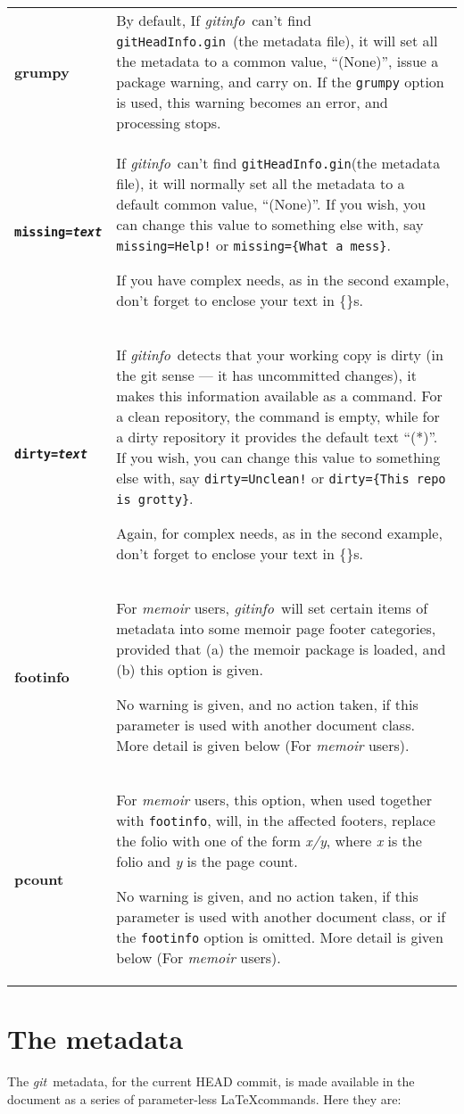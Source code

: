 \documentclass[a4paper,12pt,twoside,openany]{memoir}
\newcommand{\sfit}[1]{\textit{#1}}
\newcommand{\git}{\sfit{git}}
\newcommand{\tpname}{\sfit{gitinfo}}
\newcommand{\ginname}{gitHeadInfo.gin}
\newcommand{\metaname}{\texttt{\ginname}}
\begin{document}
\noindent
\begin{tabularx}{\textwidth}{@{}>{\ttfamily\bfseries}lX@{}}
grumpy&
By default, If \tpname\ can't find \metaname\ (the metadata file),
it will set all the metadata to a common value, ``(None)'',
issue a package warning, and carry on.
If the \texttt{grumpy} option is used,
this warning becomes an error, and processing stops.
\\
\texttt{missing=\textit{text}}&
If \tpname\ can't find \metaname (the metadata file),
it will normally set all the metadata to a default common value, ``(None)''.
If you wish, you can change this value to something else with, say
\texttt{missing=Help!} or \texttt{missing=\{What a mess\}}.

If you have complex needs, as in the second example,
don't forget to enclose your text in \{\}s. 
\\
\texttt{dirty=\textit{text}}&
If \tpname\ detects that your working copy is dirty 
(in the git sense --- it has uncommitted changes),
it makes this information available as a command.
For a clean repository, the command is empty, while for a dirty repository
it provides the default text ``(*)''.
If you wish, you can change this value to something else with, say
\texttt{dirty=Unclean!} or \texttt{dirty=\{This repo is grotty\}}.

Again, for complex needs, as in the second example,
don't forget to enclose your text in \{\}s. 
\\
footinfo&
For \sfit{memoir} users, \tpname\ will set certain items of metadata into
some memoir page footer categories,
provided that (a) the memoir package is loaded,
and (b) this option is given.

No warning is given, and no action taken,
if this parameter is used with another document class.
More detail is given below (For \textit{memoir} users).
\\
pcount&
For \sfit{memoir} users, this option, when used together with \texttt{footinfo},
will, in the affected footers, replace the folio with one of the form \textit{x/y},
where \textit{x} is the folio and \textit{y} is the page count.

No warning is given, and no action taken,
if this parameter is used with another document class,
or if the \texttt{footinfo} option is omitted.
More detail is given below (For \textit{memoir} users).
\end{tabularx}
\clearpage
\section{The metadata}
The \git\ metadata, for the current HEAD commit,
is made available in the document
as a series of parameter-less \LaTeX commands.
Here they are:
\vspace{0.5\baselineskip}
\end{document}

